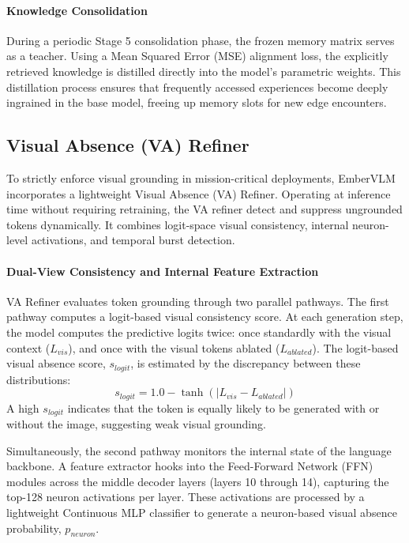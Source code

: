 \documentclass[runningheads]{llncs}
\begin{document}
\paragraph{Knowledge Consolidation}
During a periodic Stage 5 consolidation phase, the frozen memory matrix serves as a teacher. Using a Mean Squared Error (MSE) alignment loss, the explicitly retrieved knowledge is distilled directly into the model's parametric weights. This distillation process ensures that frequently accessed experiences become deeply ingrained in the base model, freeing up memory slots for new edge encounters.

\subsection{Visual Absence (VA) Refiner}
\label{sec:refiner}

To strictly enforce visual grounding in mission-critical deployments, EmberVLM incorporates a lightweight Visual Absence (VA) Refiner. Operating at inference time without requiring retraining, the VA refiner detect and suppress ungrounded tokens dynamically. It combines logit-space visual consistency, internal neuron-level activations, and temporal burst detection.

\paragraph{Dual-View Consistency and Internal Feature Extraction}
VA Refiner evaluates token grounding through two parallel pathways. The first pathway computes a logit-based visual consistency score. At each generation step, the model computes the predictive logits twice: once standardly with the visual context ($L_{vis}$), and once with the visual tokens ablated ($L_{ablated}$). The logit-based visual absence score, $s_{logit}$, is estimated by the discrepancy between these distributions:
\begin{equation}
    s_{logit} = 1.0 - \tanh(|L_{vis} - L_{ablated}|)
\end{equation}
A high $s_{logit}$ indicates that the token is equally likely to be generated with or without the image, suggesting weak visual grounding.

Simultaneously, the second pathway monitors the internal state of the language backbone. A feature extractor hooks into the Feed-Forward Network (FFN) modules across the middle decoder layers (layers 10 through 14), capturing the top-128 neuron activations per layer. These activations are processed by a lightweight Continuous MLP classifier to generate a neuron-based visual absence probability, $p_{neuron}$. 
\end{document}
